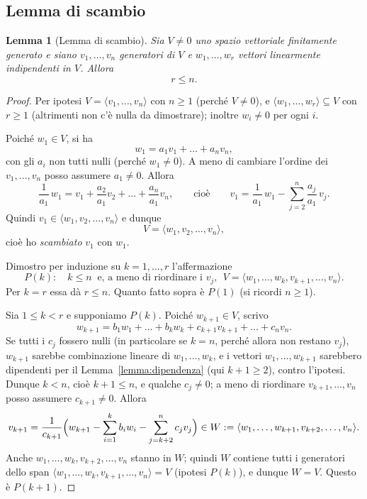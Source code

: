 \documentclass[11pt,a4paper]{article}
\theoremstyle{plain}
\newtheorem{lemma}[prop]{Lemma}
\theoremstyle{definition}
\theoremstyle{remark}
\begin{document}
\subsection{Lemma di scambio}

\begin{lemma}[Lemma di scambio]\label{lemma:scambio}
Sia $V\neq0$ uno spazio vettoriale finitamente generato e siano $v_1,\dots,v_n$ generatori di $V$ e $w_1,\dots,w_r$ vettori linearmente indipendenti in $V$.
Allora
\[
  r\le n .
\]
\end{lemma}

\begin{proof}
Per ipotesi $V=\langle v_1,\dots,v_n\rangle$ con $n\ge1$ (perché $V\neq0$), e $\langle w_1,\dots,w_r\rangle\subseteq V$ con $r\ge1$ (altrimenti non c'è nulla da dimostrare); inoltre $w_i\neq0$ per ogni $i$.

Poiché $w_1\in V$, si ha
\[
  w_1=a_1v_1+\dots+a_nv_n ,
\]
con gli $a_i$ non tutti nulli (perché $w_1\neq0$).
A meno di cambiare l'ordine dei $v_1,\dots,v_n$ posso assumere $a_1\neq0$. Allora
\[
  \frac1{a_1}\,w_1=v_1+\frac{a_2}{a_1}v_2+\dots+\frac{a_n}{a_1}v_n ,
  \qquad\text{cioè}\qquad
  v_1=\frac1{a_1}\,w_1-\sum_{j=2}^{n}\frac{a_j}{a_1}\,v_j .
\]
Quindi $v_1\in\langle w_1,v_2,\dots,v_n\rangle$ e dunque
\[
  V=\langle w_1,v_2,\dots,v_n\rangle ,
\]
cioè ho \emph{scambiato} $v_1$ con $w_1$.

Dimostro per induzione su $k=1,\dots,r$ l'affermazione
\[
  P(k):\quad k\le n\ \text{ e, a meno di riordinare i } v_j,\ \ V=\langle w_1,\dots,w_k,v_{k+1},\dots,v_n\rangle .
\]
Per $k=r$ essa dà $r\le n$. Quanto fatto sopra è $P(1)$ (si ricordi $n\ge1$).

Sia $1\le k<r$ e supponiamo $P(k)$. Poiché $w_{k+1}\in V$, scrivo
\[
  w_{k+1}=b_1w_1+\dots+b_kw_k+c_{k+1}v_{k+1}+\dots+c_nv_n .
\]
Se tutti i $c_j$ fossero nulli (in particolare se $k=n$, perché allora non restano $v_j$), $w_{k+1}$ sarebbe combinazione lineare di $w_1,\dots,w_k$, e i vettori $w_1,\dots,w_{k+1}$ sarebbero dipendenti per il Lemma~\ref{lemma:dipendenza} (qui $k+1\ge2$), contro l'ipotesi.
Dunque $k<n$, cioè $k+1\le n$, e qualche $c_j\ne0$; a meno di riordinare $v_{k+1},\dots,v_n$ posso assumere $c_{k+1}\ne0$. Allora
\[
  v_{k+1}=\frac1{c_{k+1}}\Bigl(w_{k+1}-\sum_{i=1}^{k}b_iw_i-\sum_{j=k+2}^{n}c_jv_j\Bigr)\in W:=\langle w_1,\dots,w_{k+1},v_{k+2},\dots,v_n\rangle .
\]
Anche $w_1,\dots,w_k,v_{k+2},\dots,v_n$ stanno in $W$; quindi $W$ contiene tutti i generatori dello span $\langle w_1,\dots,w_k,v_{k+1},\dots,v_n\rangle=V$ (ipotesi $P(k)$), e dunque $W=V$. Questo è $P(k+1)$.
\end{proof}
\end{document}
